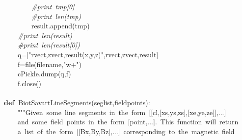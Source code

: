 \documentclass{article}
\newcommand{\hlstd}[1]{\textcolor[rgb]{0,0,0}{#1}}
\newcommand{\hlstr}[1]{\textcolor[rgb]{1,0,0}{#1}}
\newcommand{\hlslc}[1]{\textcolor[rgb]{0.51,0.51,0.51}{\it{#1}}}
\newcommand{\hlsym}[1]{\textcolor[rgb]{0,0,0}{#1}}
\newcommand{\hlkwa}[1]{\textcolor[rgb]{0,0,0}{\bf{#1}}}
\newcommand{\hlkwb}[1]{\textcolor[rgb]{0.51,0,0}{#1}}
\newcommand{\hlkwd}[1]{\textcolor[rgb]{0,0,0.51}{#1}}
\begin{document}
\hlstd{}\hlstd{\ \ \ \ \ \ \ \ }\hlstd{}\hlslc{\#print\ tmp{[}0{]}}\hspace*{\fill}\\
\hlstd{}\hlstd{\ \ \ \ \ \ \ \ }\hlstd{}\hlslc{\#print\ len(tmp)}\hspace*{\fill}\\
\hlstd{}\hlstd{\ \ \ \ \ \ \ \ }\hlstd{result}\hlsym{.}\hlstd{}\hlkwd{append}\hlstd{}\hlsym{(}\hlstd{tmp}\hlsym{)}\hspace*{\fill}\\
\hlstd{}\hlstd{\ \ \ \ }\hlstd{}\hlslc{\#print\ len(result)}\hspace*{\fill}\\
\hlstd{}\hlstd{\ \ \ \ }\hlstd{}\hlslc{\#print\ len(result{[}0{]})}\hspace*{\fill}\\
\hlstd{}\hlstd{\ \ \ \ }\hlstd{q}\hlsym{={[}}\hlstd{}\hlstr{"rvect,zvect,result(x,y,z)"}\hlstd{}\hlsym{,}\hlstd{rvect}\hlsym{,}\hlstd{zvect}\hlsym{,}\hlstd{result}\hlsym{{]}}\hspace*{\fill}\\
\hlstd{}\hlstd{\ \ \ \ }\hlstd{f}\hlsym{=}\hlstd{}\hlkwb{file}\hlstd{}\hlsym{(}\hlstd{filename}\hlsym{,}\hlstd{}\hlstr{"w+"}\hlstd{}\hlsym{)}\hspace*{\fill}\\
\hlstd{}\hlstd{\ \ \ \ }\hlstd{cPickle}\hlsym{.}\hlstd{}\hlkwd{dump}\hlstd{}\hlsym{(}\hlstd{q}\hlsym{,}\hlstd{f}\hlsym{)}\hspace*{\fill}\\
\hlstd{}\hlstd{\ \ \ \ }\hlstd{f}\hlsym{.}\hlstd{}\hlkwd{close}\hlstd{}\hlsym{()}\hspace*{\fill}\\
\hlstd{}\hspace*{\fill}\\
\hlkwa{def\ }\hlstd{}\hlkwd{Biot\textunderscore Savart\textunderscore LineSegments}\hlstd{}\hlsym{(}\hlstd{seglist}\hlsym{,}\hlstd{fieldpoints}\hlsym{):}\hspace*{\fill}\\
\hlstd{}\hlstd{\ \ \ \ }\hlstd{}\hlstr{"""Given\ some\ line\ segments\ in\ the\ form\ {[}{[}cl,{[}xs,ys,zs{]},{[}xe,ye,ze{]}{]},...{]}}\hspace*{\fill}\\
\hlstr{}\hlstd{\ \ \ \ }\hlstr{and\ some\ field\ points\ in\ the\ form\ {[}point,...{]}.\ This\ function\ will\ return}\hspace*{\fill}\\
\hlstr{}\hlstd{\ \ \ \ }\hlstr{a\ list\ of\ the\ form\ {[}{[}Bx,By,Bz{]},...{]}\ corresponding\ to\ the\ magnetic\ field}\hspace*{\fill}\\
\end{document}
